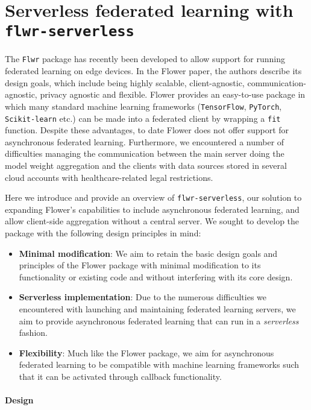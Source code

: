 \documentclass[twocolumn, switch]{article} %
\begin{document}
\section{Serverless federated learning with \texttt{flwr-serverless}}

The \texttt{Flwr} package \cite{flower} has recently been developed to allow support for running federated learning on edge devices. In the Flower paper, the authors describe its design goals, which include being highly scalable, client-agnostic, communication-agnostic, privacy agnostic and flexible. Flower provides an easy-to-use package in which many standard machine learning frameworks (\texttt{TensorFlow}, \texttt{PyTorch}, \texttt{Scikit-learn} etc.) can be made into a federated client by wrapping a \texttt{fit} function. Despite these advantages, to date Flower does not offer support for asynchronous federated learning. Furthermore, we encountered a number of difficulties managing the communication between the main server doing the model weight aggregation and the clients with data sources stored in several cloud accounts with healthcare-related legal restrictions.

Here we introduce and provide an overview of \texttt{flwr-serverless}, our solution to expanding Flower's capabilities to include asynchronous federated learning, and allow client-side aggregation without a central server. We sought to develop the package with the following design principles in mind:

\begin{itemize}
    \item \textbf{Minimal modification}: We aim to retain the basic design goals and principles of the Flower package with minimal modification to its functionality or existing code and without interfering with its core design.
    \item \textbf{Serverless implementation}: Due to the numerous difficulties we encountered with launching and maintaining federated learning servers, we aim to provide asynchronous federated learning that can run in a \textit{serverless} fashion.
    \item \textbf{Flexibility}: Much like the Flower package, we aim for asynchronous federated learning to be compatible with machine learning frameworks such that it can be activated through callback functionality.
\end{itemize}

\paragraph{Design}
\end{document}
